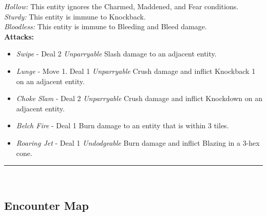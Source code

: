 \emph{Hollow:} This entity ignores the Charmed, Maddened, and Fear conditions.\\

\emph{Sturdy:} This entity is immune to Knockback.\\

\emph{Bloodless:} This entity is immune to Bleeding and Bleed damage.\\

\textbf{Attacks:}
\begin{itemize}
\item \emph{Swipe} -  Deal 2 \emph{Unparryable} Slash damage to an adjacent entity.
\item \emph{Lunge} - Move 1. Deal 1 \emph{Unparryable} Crush damage and inflict Knockback 1 on an adjacent entity.
\item \emph{Choke Slam} - Deal 2 \emph{Unparryable} Crush damage and inflict Knockdown on an adjacent entity.
\item \emph{Belch Fire} - Deal 1 Burn damage to an entity that is within 3 tiles.
\item \emph{Roaring Jet} - Deal 1 \emph{Undodgeable} Burn damage and inflict Blazing in a 3-hex cone.
\end{itemize}
\hrule
\ \\

\pagebreak

\subsection*{Encounter Map}
\begin{center}
\end{center}

